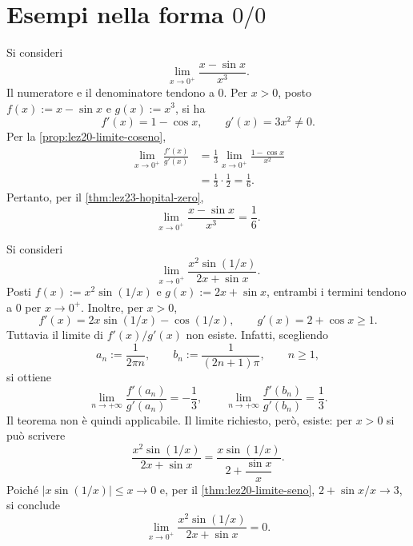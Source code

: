 \section{Esempi nella forma \(0/0\)}
\label{sec:lez23-esempi-zero}

\begin{example}
\label{ex:lez23-seno-cubico}
Si consideri
\[
  \lim_{x\to0^+}\frac{x-\sin x}{x^3}.
\]
Il numeratore e il denominatore tendono a \(0\).
Per \(x>0\), posto \(f(x):=x-\sin x\) e
\(g(x):=x^3\), si ha
\[
  f'(x)=1-\cos x,
  \qquad g'(x)=3x^2\ne0.
\]
Per la \cref{prop:lez20-limite-coseno},
\[
\begin{aligned}
  \lim_{x\to0^+}\frac{f'(x)}{g'(x)}
  &=\frac13\lim_{x\to0^+}\frac{1-\cos x}{x^2}\\
  &=\frac13\cdot\frac12=\frac16.
\end{aligned}
\]
Pertanto, per il \cref{thm:lez23-hopital-zero},
\[
  \lim_{x\to0^+}\frac{x-\sin x}{x^3}=\frac16.
\]
\end{example}

\begin{example}
\label{ex:lez23-hopital-non-applicabile}
Si consideri
\[
  \lim_{x\to0^+}\frac{x^2\sin(1/x)}{2x+\sin x}.
\]
Posti \(f(x):=x^2\sin(1/x)\) e
\(g(x):=2x+\sin x\), entrambi i termini tendono
a \(0\) per \(x\to0^+\). Inoltre, per \(x>0\),
\[
  f'(x)=2x\sin(1/x)-\cos(1/x),
  \qquad g'(x)=2+\cos x\ge1.
\]
Tuttavia il limite di \(f'(x)/g'(x)\) non esiste.
Infatti, scegliendo
\[
  a_n:=\frac1{2\pi n},
  \qquad b_n:=\frac1{(2n+1)\pi},
  \qquad n\ge1,
\]
si ottiene
\[
  \lim_{n\to+\infty}\frac{f'(a_n)}{g'(a_n)}=-\frac13,
  \qquad
  \lim_{n\to+\infty}\frac{f'(b_n)}{g'(b_n)}=\frac13.
\]
Il teorema non è quindi applicabile. Il limite richiesto,
però, esiste: per \(x>0\) si può scrivere
\[
  \frac{x^2\sin(1/x)}{2x+\sin x}
  =\frac{x\sin(1/x)}{2+\dfrac{\sin x}{x}}.
\]
Poiché \(|x\sin(1/x)|\le x\to0\) e,
per il \cref{thm:lez20-limite-seno},
\(2+\sin x/x\to3\), si conclude
\[
  \lim_{x\to0^+}\frac{x^2\sin(1/x)}{2x+\sin x}=0.
\]
\end{example}

